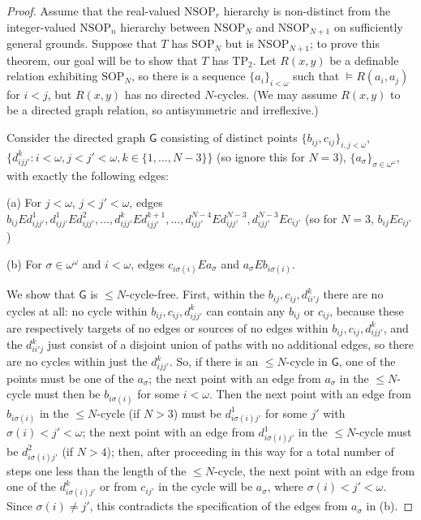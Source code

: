\documentclass{amsart}
\theoremstyle{definition}
\theoremstyle{remark}
\numberwithin{equation}{section}
\begin{document}
\begin{proof}
    Assume that the real-valued $\mathrm{NSOP}_{r}$ hierarchy is non-distinct from the integer-valued $\mathrm{NSOP}_{n}$ hierarchy between $\mathrm{NSOP}_{N}$ and $\mathrm{NSOP}_{N+1}$ on sufficiently general grounds. Suppose that $T$ has $\mathrm{SOP}_{N}$ but is $\mathrm{NSOP}_{N+1}$; to prove this theorem, our goal will be to show that $T$ has $\mathrm{TP}_{2}$. Let $R(x, y)$ be a definable relation exhibiting $\mathrm{SOP}_{N}$, so there is a sequence $\{a_{i}\}_{i < \omega}$ such that $\models R(a_i, a_j)$ for $i < j$, but $R(x, y)$ has no directed $N$-cycles. (We may assume $R(x, y)$ to be a directed graph relation, so antisymmetric and irreflexive.)

    Consider the directed graph $\mathsf{G}$ consisting of distinct points $\{b_{ij}, c_{ij}\}_{i, j < \omega}$, $\{d^{k}_{ijj'}: i<\omega, j<j' < \omega, k\in \{1, \ldots, N-3\}\}$ (so ignore this for $N = 3$), $\{a_{\sigma}\}_{\sigma \in \omega^{\omega}}$, with exactly the following edges:

    (a) For $j < \omega$, $j < j' < \omega$, edges $b_{ij} E d^{1}_{ijj'}, d^{1}_{ijj'}Ed_{ijj'}^{2}, \ldots, d^{k}_{ijj'}Ed^{k+1}_{ijj'}, \ldots, d^{N-4}_{ijj'}Ed^{N-3}_{ijj'},d^{N-3}_{ijj'} E c_{ij'} $ (so for $N = 3$, $b_{ij} E c_{ij'}$)

    (b) For $\sigma \in \omega^{\omega}$ and $i < \omega$, edges $c_{i \sigma(i)} E a_{\sigma}$ and $a_{\sigma} E b_{i \sigma(i)}$.


We show that $\mathsf{G}$ is $\leq N$-cycle-free. First, within the $b_{ij}, c_{ij}, d^{k}_{ii'j}$ there are no cycles at all: no cycle within $b_{ij}, c_{ij}, d^{k}_{ijj'}$ can contain any $b_{ij}$ or $c_{ij}$, because these are respectively targets of no edges or sources of no edges within $b_{ij}, c_{ij}, d^{k}_{ijj'}$, and the $d^{k}_{ii'j}$ just consist of a disjoint union of paths with no additional edges, so there are no cycles within just the $d^{k}_{ijj'}$. So, if there is an $\leq N$-cycle in $\mathsf{G}$, one of the points must be one of the $a_{\sigma}$; the next point with an edge from $a_{\sigma}$ in the $\leq N$-cycle must then be $b_{i\sigma(i)}$ for some $i < \omega$. Then the next point with an edge from $b_{i\sigma(i)}$ in the $\leq N$-cycle (if $N > 3$) must be $d_{i\sigma(i)j'}^{1}$ for some $j'$ with $\sigma(i)< j' < \omega$; the next point with an edge from $d_{i\sigma(i)j'}^{1}$ in the $\leq N$-cycle must be $d_{i\sigma(i)j'}^{2}$ (if $N > 4$); then, after proceeding in this way for a total number of steps one less than the length of the $\leq N$-cycle, the next point with an edge from one of the $d_{i\sigma(i)j'}^{k}$ or from $c_{ij'}$ in the cycle will be $a_{\sigma}$, where $\sigma(i)< j' < \omega$. Since $\sigma(i) \neq j'$, this contradicts the specification of the edges from $a_{\sigma}$ in (b).



\end{proof}
\end{document}
